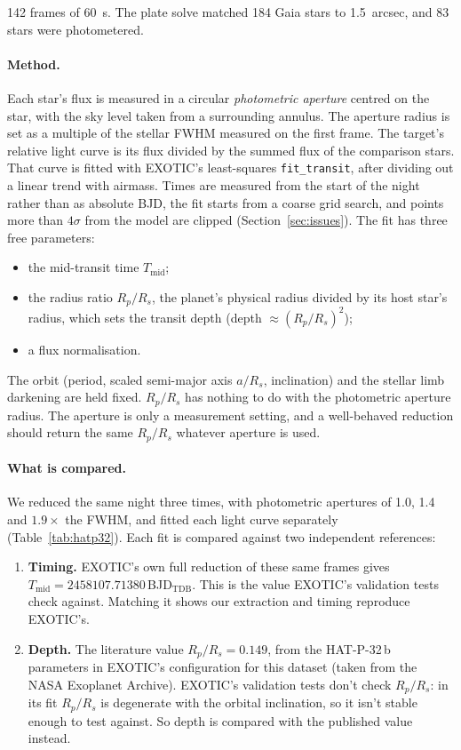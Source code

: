 \documentclass[11pt,a4paper]{article}
\begin{document}
142 frames of \SI{60}{s}. The plate solve matched 184 Gaia stars to
\SI{1.5}{arcsec}, and 83 stars were photometered.

\paragraph{Method.}
Each star's flux is measured in a circular \emph{photometric aperture}
centred on the star, with the sky level taken from a surrounding annulus.
The aperture radius is set as a multiple of the stellar FWHM measured on
the first frame. The target's relative light curve is its flux divided by
the summed flux of the comparison stars. That curve is fitted with EXOTIC's
least-squares \texttt{fit\_transit}, after dividing out a linear trend with
airmass. Times are measured from the start of the night rather than as
absolute BJD, the fit starts from a coarse grid search, and points more
than $4\sigma$ from the model are clipped (Section~\ref{sec:issues}). The
fit has three free parameters:
\begin{itemize}
  \item the mid-transit time $T_\mathrm{mid}$;
  \item the radius ratio $R_p/R_s$, the planet's physical radius divided by
        its host star's radius, which sets the transit depth
        (depth $\approx (R_p/R_s)^2$);
  \item a flux normalisation.
\end{itemize}
The orbit (period, scaled semi-major axis $a/R_s$, inclination) and the
stellar limb darkening are held fixed. $R_p/R_s$ has nothing to do with the
photometric aperture radius. The aperture is only a measurement setting,
and a well-behaved reduction should return the same $R_p/R_s$ whatever
aperture is used.

\paragraph{What is compared.}
We reduced the same night three times, with photometric apertures of 1.0,
1.4 and $1.9\times$ the FWHM, and fitted each light curve separately
(Table~\ref{tab:hatp32}). Each fit is compared against two independent
references:
\begin{enumerate}
  \item \textbf{Timing.} EXOTIC's own full reduction of these same frames
        gives $T_\mathrm{mid}=2458107.71380$\,BJD$_\mathrm{TDB}$. This is
        the value EXOTIC's validation tests check against. Matching it shows
        our extraction and timing reproduce EXOTIC's.
  \item \textbf{Depth.} The literature value $R_p/R_s=0.149$, from the
        HAT-P-32\,b parameters in EXOTIC's configuration for this dataset
        (taken from the NASA Exoplanet Archive). EXOTIC's validation tests
        don't check $R_p/R_s$: in its fit $R_p/R_s$ is degenerate with
        the orbital inclination, so it isn't stable enough to test against.
        So depth is compared with the published value instead.
\end{enumerate}
\end{document}
